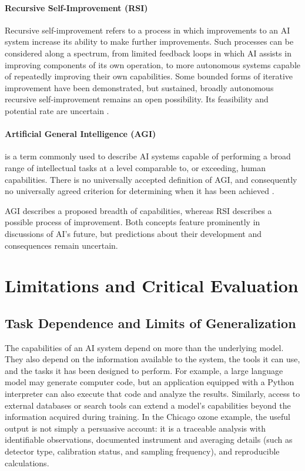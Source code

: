 \documentclass[11pt]{article}
\begin{document}
\paragraph{Recursive Self-Improvement (RSI)}
Recursive self-improvement refers to a process in which improvements to an AI system increase its ability to make further improvements. Such processes can be considered along a spectrum, from limited feedback loops in which AI assists in improving components of its own operation, to more autonomous systems capable of repeatedly improving their own capabilities. Some bounded forms of iterative improvement have been demonstrated, but sustained, broadly autonomous recursive self-improvement remains an open possibility. Its feasibility and potential rate are uncertain \citep{StanfordHAIRSI,Anthropic2026RSI}.

\paragraph{Artificial General Intelligence (AGI)} is a term commonly used to describe AI systems capable of performing a broad range of intellectual tasks at a level comparable to, or exceeding, human capabilities. There is no universally accepted definition of AGI, and consequently no universally agreed criterion for determining when it has been achieved \citep{StanfordHAIAGI}.

AGI describes a proposed breadth of capabilities, whereas RSI describes a possible process of improvement. Both concepts feature prominently in discussions of AI's future, but predictions about their development and consequences remain uncertain.

\section{Limitations and Critical Evaluation}\label{sec:limitations}

\subsection{Task Dependence and Limits of Generalization}

The capabilities of an AI system depend on more than the
underlying model. They also depend on the information
available to the system, the tools it can use, and the
tasks it has been designed to perform. For example, a
large language model may generate computer code, but
an application equipped with a Python interpreter can
also execute that code and analyze the results.
Similarly, access to external databases or search
tools can extend a model's capabilities beyond the
information acquired during training. 
In the Chicago ozone example, the useful output is not simply a persuasive account: it is a traceable analysis with identifiable observations, documented instrument and averaging details (such as detector type, calibration status, and sampling frequency), and reproducible calculations.
\end{document}

